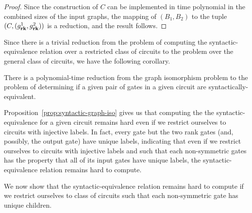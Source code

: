 \documentclass[../paper.tex]{subfiles}
\begin{document}
\begin{proof}
  Since the construction of $C$ can be implemented in time polynomial in the
  combined sizes of the input graphs, the mapping of $(B_1, B_2)$ to the tuple
  $(C, (g^1_{\text{\textbf{rk}}}, g^2_{\text{\textbf{rk}}}))$ is a reduction, and the result follows.
\end{proof}

Since there is a trivial reduction from the problem of computing the
syntactic-equivalence relation over a restricted class of circuits to the
problem over the general class of circuits, we have the following corollary.

\begin{cor}
  There is a polynomial-time reduction from the graph isomorphism problem to the
  problem of determining if a given pair of gates in a given circuit are
  syntactically-equivalent.
  \label{lem:syntactically-equivilent-general-hard}
\end{cor}

Proposition~\ref{prop:syntactic-graph-iso} gives us that computing the the
syntactic-equivalence for a given circuit remains hard even if we restrict
ourselves to circuits with injective labels. In fact, every gate but the two
rank gates (and, possibly, the output gate) have unique labels, indicating that
even if we restrict ourselves to circuits with injective labels and such that
each non-symmetric gates has the property that all of its input gates have
unique labels, the syntactic-equivalence relation remains hard to compute.

We now show that the syntactic-equivalence relation remains hard to compute if
we restrict ourselves to class of circuits such that each non-symmetric gate has
unique children.
\end{document}

